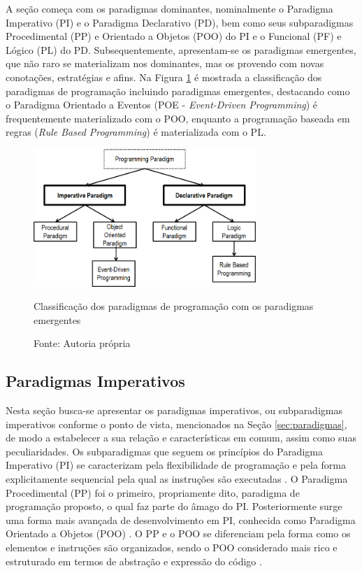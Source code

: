 A seção começa com os paradigmas dominantes, nominalmente o Paradigma Imperativo
(PI) e o Paradigma Declarativo (PD), bem como seus subparadigmas Procedimental
(PP) e Orientado a Objetos (POO) do PI e o Funcional (PF) e Lógico (PL) do PD.
Subsequentemente, apresentam-se os paradigmas emergentes, que não raro se
materializam nos dominantes, mas os provendo com novas conotações, estratégias e
afins. Na Figura \ref{fig:paradigmas_simao} é mostrada a classificação dos
paradigmas de programação incluindo paradigmas emergentes, destacando como o
Paradigma Orientado a Eventos (POE - \textit{Event-Driven Programming}) é
frequentemente materializado com o POO, enquanto a programação baseada em regras
(\textit{Rule Based Programming}) é materializada com o PL.

\begin{figure}[!htb]
  \centering
  \includegraphics[width=0.75\textwidth]{../figures/paradimas_simao.png}
  \caption{Classificação dos paradigmas de programação com os paradigmas emergentes}
  \caption*{Fonte: Autoria própria}
  \label{fig:paradigmas_simao}
\end{figure}

\subsection{Paradigmas Imperativos}\label{sec:imperativos}

Nesta seção busca-se apresentar os paradigmas imperativos, ou subparadigmas
imperativos conforme o ponto de vista, mencionados na Seção
\ref{sec:paradigmas}, de modo a estabelecer a sua relação e características em
comum, assim como suas peculiaridades. Os subparadigmas que seguem os princípios
do Paradigma Imperativo (PI) se caracterizam pela flexibilidade de programação e
pela forma explicitamente sequencial pela qual as instruções são executadas
\cite{msc_Banaszewski_2009}. O Paradigma Procedimental (PP) foi o primeiro,
propriamente dito, paradigma de programação proposto, o qual faz parte do âmago
do PI. Posteriormente surge uma forma mais avançada de desenvolvimento em PI,
conhecida como Paradigma Orientado a Objetos (POO) \cite{msc_Banaszewski_2009}.
O PP e o POO se diferenciam pela forma como os elementos e instruções são
organizados, sendo o POO considerado mais rico e estruturado em termos de
abstração e expressão do código \cite{doc_ronszcka_2019}.

